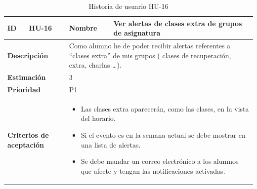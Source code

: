 \begin{table}[H]
    \centering
    \begin{tabular}{|p{2cm}|p{4cm}|p{2cm}|p{4cm}|}
        \hline
        \textbf{ID} & HU-16 & \textbf{Nombre} & Ver alertas de clases extra de grupos de asignatura \\
        \hline
        \multicolumn{2}{|p{6cm}|}{\textbf{Descripción}} & \multicolumn{2}{p{6cm}|}{Como alumno he de poder recibir alertas referentes a “clases extra” de mis grupos ( clases de recuperación, extra, charlas …).} \\
        \hline
        \multicolumn{2}{|p{6cm}|}{\textbf{Estimación}} & \multicolumn{2}{p{6cm}|}{3} \\
        \hline
        \multicolumn{2}{|p{6cm}|}{\textbf{Prioridad}} & \multicolumn{2}{p{6cm}|}{P1} \\
        \hline
        \multicolumn{2}{|p{6cm}|}{\textbf{Criterios de aceptación}} & \multicolumn{2}{p{6cm}|}{
            \begin{itemize}
                \item Las clases extra aparecerán, como las clases, en la vista del horario.
                \item Si el evento es en la semana actual se debe mostrar en una lista de alertas.
                \item Se debe mandar un correo electrónico a los alumnos que afecte y tengan las notificaciones activadas.
            \end{itemize}
        } \\
        \hline
    \end{tabular}
    \caption{Historia de usuario HU-16}
    \label{tab:hu_16}
\end{table}

